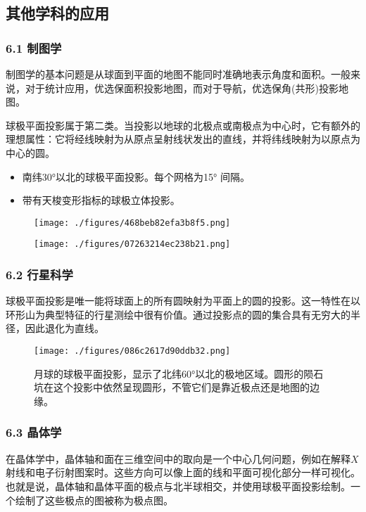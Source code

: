 \subsection{其他学科的应用}
\subsubsection{6.1 制图学}
制图学的基本问题是从球面到平面的地图不能同时准确地表示角度和面积。一般来说，对于统计应用，优选保面积投影地图，而对于导航，优选保角(共形)投影地图。

球极平面投影属于第二类。当投影以地球的北极点或南极点为中心时，它有额外的理想属性：它将经线映射为从原点呈射线状发出的直线，并将纬线映射为以原点为中心的圆。
\begin{itemize}
\item 南纬30°以北的球极平面投影。每个网格为15° 间隔。
\item 带有天梭变形指标的球极立体投影。
\end{itemize}
\begin{figure}[ht]
\centering
\texttt{[image: ./figures/468beb82efa3b8f5.png]}
\caption{} \label{fig_QJPMTY_21}
\end{figure}
\begin{figure}[ht]
\centering
\texttt{[image: ./figures/07263214ec238b21.png]}
\caption{} \label{fig_QJPMTY_22}
\end{figure}
\subsubsection{6.2 行星科学}
球极平面投影是唯一能将球面上的所有圆映射为平面上的圆的投影。这一特性在以环形山为典型特征的行星测绘中很有价值。通过投影点的圆的集合具有无穷大的半径，因此退化为直线。
\begin{figure}[ht]
\centering
\texttt{[image: ./figures/086c2617d90ddb32.png]}
\caption{月球的球极平面投影，显示了北纬60°以北的极地区域。圆形的陨石坑在这个投影中依然呈现圆形，不管它们是靠近极点还是地图的边缘。} \label{fig_QJPMTY_23}
\end{figure}
\subsubsection{6.3 晶体学}
在晶体学中，晶体轴和面在三维空间中的取向是一个中心几何问题，例如在解释$X$射线和电子衍射图案时。这些方向可以像上面的线和平面可视化部分一样可视化。也就是说，晶体轴和晶体平面的极点与北半球相交，并使用球极平面投影绘制。一个绘制了这些极点的图被称为极点图。

